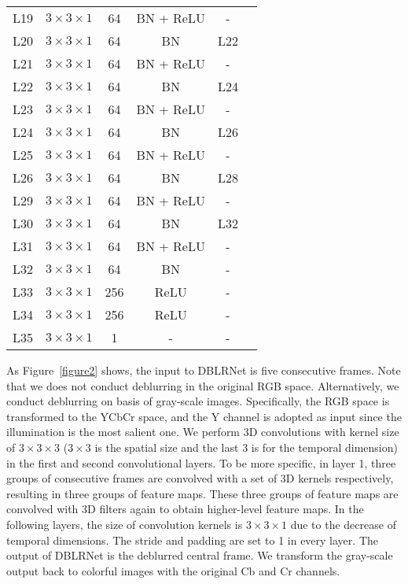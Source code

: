 \documentclass[journal]{IEEEtran}
\begin{document}
\begin{table}
\begin{tabular}{cccccc}
     L19    & $3 \times 3 \times 1$  & 64 & BN + ReLU & - \\
     L20    & $3 \times 3 \times 1$  & 64 & BN        & L22 \\
     L21    & $3 \times 3 \times 1$  & 64 & BN + ReLU & - \\
     L22    & $3 \times 3 \times 1$  & 64 & BN        & L24 \\
     L23    & $3 \times 3 \times 1$  & 64 & BN + ReLU & - \\
     L24    & $3 \times 3 \times 1$  & 64 & BN        & L26 \\
     L25    & $3 \times 3 \times 1$  & 64 & BN + ReLU & - \\
     L26    & $3 \times 3 \times 1$  & 64 & BN        & L28 \\
     L29    & $3 \times 3 \times 1$  & 64 & BN + ReLU & - \\
     L30    & $3 \times 3 \times 1$  & 64 & BN        & L32 \\
     \midrule
     L31    & $3 \times 3 \times 1$  & 64 & BN + ReLU & - \\
     L32    & $3 \times 3 \times 1$  & 64 & BN        & - \\
 	\midrule
     L33    & $3 \times 3 \times 1$  & 256&     ReLU & - \\
     L34    & $3 \times 3 \times 1$  & 256&     ReLU & - \\
     L35    & $3 \times 3 \times 1$  & 1  &    -     & - \\
    \bottomrule
    \end{tabular}
  \label{table1}
\end{table}

As Figure~\ref{figure2} shows, the input to DBLRNet is five consecutive frames. Note that we does not conduct deblurring in the original RGB space. Alternatively, we conduct deblurring on basis of gray-scale images. Specifically, the RGB space is transformed to the YCbCr space, and the Y channel is adopted as input since the illumination is the most salient one. We perform 3D convolutions with kernel size of $3 \times 3 \times 3$ ($3 \times 3$ is the spatial size and the last 3 is for the temporal dimension) in the first and second convolutional layers. To be more specific, in layer 1, three groups of consecutive frames are convolved with a set of 3D kernels respectively, resulting in three groups of feature maps. These three groups of feature maps are convolved with 3D filters again to obtain higher-level feature maps. In the following layers, the size of convolution kernels is $3 \times 3 \times 1$ due to the decrease of temporal dimensions. The stride and padding are set to 1 in every layer. The output of DBLRNet is the deblurred central frame. We transform the gray-scale output back to colorful images with the original Cb and Cr channels.
\end{document}
